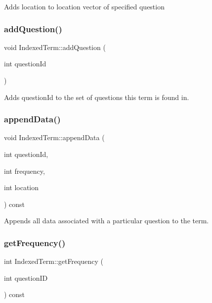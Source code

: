 Adds location to location vector of specified question \mbox{\label{classIndexedTerm_aa55a9b814c7b084b2e33fb57aa81efaf}} 
\subsubsection{\texorpdfstring{add\+Question()}{addQuestion()}}
{\footnotesize\ttfamily void Indexed\+Term\+::add\+Question (\begin{DoxyParamCaption}\item[{int}]{question\+Id }\end{DoxyParamCaption})}

Adds question\+Id to the set of questions this term is found in. \mbox{\label{classIndexedTerm_ad5b7b07b86c72b049c30204531b5cf53}} 
\subsubsection{\texorpdfstring{append\+Data()}{appendData()}}
{\footnotesize\ttfamily void Indexed\+Term\+::append\+Data (\begin{DoxyParamCaption}\item[{int}]{question\+Id,  }\item[{int}]{frequency,  }\item[{int}]{location }\end{DoxyParamCaption}) const}

Appends all data associated with a particular question to the term. \mbox{\label{classIndexedTerm_a10df671670e9581f273a7248ca5cbe4b}} 
\subsubsection{\texorpdfstring{get\+Frequency()}{getFrequency()}}
{\footnotesize\ttfamily int Indexed\+Term\+::get\+Frequency (\begin{DoxyParamCaption}\item[{int}]{question\+ID }\end{DoxyParamCaption}) const}


